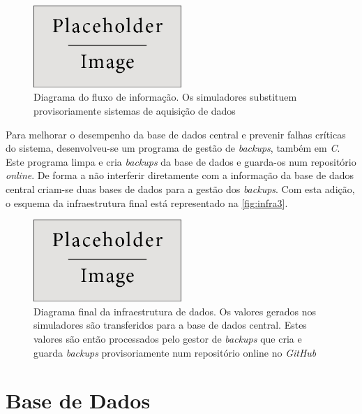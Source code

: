 \documentclass[11pt,twoside,a4paper]{report}
\begin{document}
\begin{figure}[H]
	\begin{center}
		\includegraphics[width=0.5\textwidth]{placeholder} %
		\caption{Diagrama do fluxo de informação. Os simuladores substituem provisoriamente sistemas de aquisição de dados}
		\label{fig:infra2}
		\end{center}
\end{figure}
Para melhorar o desempenho da base de dados central e prevenir falhas críticas do sistema, desenvolveu-se um programa de gestão de \textit{backups}, também em \textit{C}. Este programa limpa e cria \textit{backups} da base de dados e guarda-os num repositório \textit{online}. De forma a não interferir diretamente com a informação da base de dados central criam-se duas bases de dados para a gestão dos \textit{backups}. Com esta adição, o esquema da infraestrutura final está representado na \autoref{fig:infra3}.
\begin{figure}[H]
	\begin{center}
		\includegraphics[width=0.5\textwidth]{placeholder} %
		\caption{Diagrama final da infraestrutura de dados. Os valores gerados nos simuladores são transferidos para a base de dados central. Estes valores são então processados pelo gestor de \textit{backups} que cria e guarda \textit{backups} provisoriamente num repositório online no \textit{GitHub}}
		\label{fig:infra3}
		\end{center}
\end{figure}

\section{Base de Dados}
\end{document}
